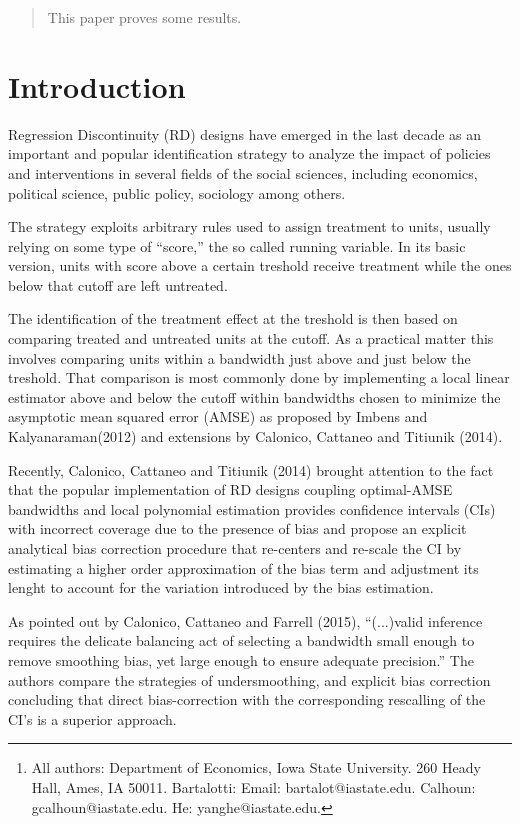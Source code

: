 \documentclass[12pt,fleqn]{article}
\author{Ot\'avio Bartalotti \and Gray Calhoun \and Yang He\thanks{All authors: 
Department of Economics, Iowa State University. 260 Heady Hall, Ames, IA  50011.
Bartalotti: Email: bartalot@iastate.edu. Calhoun: gcalhoun@iastate.edu.
He: yanghe@iastate.edu.}}
\begin{document}
\maketitle

\begin{abstract}
This paper proves some results.
\end{abstract}

\section{Introduction}
Regression Discontinuity (RD) designs have emerged in the last decade as an 
important and popular identification strategy to analyze the impact of policies
and interventions in several fields of the social sciences, including economics,
political science, public policy, sociology among others.

The strategy exploits arbitrary rules used to assign treatment to units, usually
relying on some type of ``score,'' the so called running variable. In its basic 
version, units with score above a certain treshold receive treatment while the 
ones below that cutoff are left untreated.

The identification of the treatment effect at the treshold is then based on 
comparing treated and untreated units at the cutoff. As a practical matter this 
involves comparing units within a bandwidth just above and just below the 
treshold. That comparison is most commonly done by implementing a local linear
estimator above and below the cutoff within bandwidths chosen to minimize the 
asymptotic mean squared error (AMSE) as proposed by Imbens and Kalyanaraman(2012)
and extensions by Calonico, Cattaneo and Titiunik (2014).

Recently, Calonico, Cattaneo and Titiunik (2014) brought attention to the fact
that the popular implementation of RD designs coupling optimal-AMSE bandwidths
and local polynomial estimation provides confidence intervals (CIs) with
incorrect coverage due to the presence of bias and propose an explicit analytical
bias correction procedure that re-centers and re-scale the CI by estimating a higher 
order approximation of the bias term and adjustment its lenght to account for 
the variation introduced by the bias estimation.

As pointed out by Calonico, Cattaneo and Farrell (2015), ``(...)valid inference
requires the delicate balancing act of selecting a bandwidth small enough
to remove smoothing bias, yet large enough to ensure adequate precision.''
The authors compare the strategies of undersmoothing, and explicit bias 
correction concluding that direct bias-correction with the corresponding 
rescalling of the CI's is a superior approach.
\end{document}
